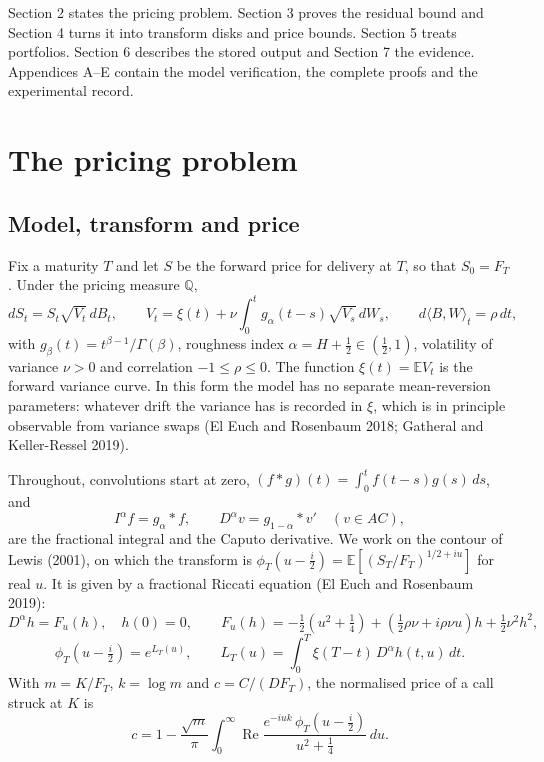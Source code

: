 \documentclass[11pt,a4paper]{article}
\begin{document}
Section 2 states the pricing problem. Section 3 proves the residual bound and Section 4 turns it into transform disks and price bounds. Section 5 treats portfolios. Section 6 describes the stored output and Section 7 the evidence. Appendices A–E contain the model verification, the complete proofs and the experimental record.

\setcounter{section}{1}\section{The pricing problem}

\setcounter{subsection}{0}\subsection{Model, transform and price}

Fix a maturity \(T\) and let \(S\) be the forward price for delivery at \(T\), so that \(S_0=F_T\). Under the pricing measure \(\mathbb Q\),
\begin{equation*}\tag{2.1}
dS_t=S_t\sqrt{V_t}\,dB_t,\qquad
V_t=\xi(t)+\nu\int_0^tg_\alpha(t-s)\sqrt{V_s}\,dW_s,\qquad
d\langle B,W\rangle_t=\rho\,dt,
\end{equation*}
with \(g_\beta(t)=t^{\beta-1}/\Gamma(\beta)\), roughness index \(\alpha=H+\tfrac12\in(\tfrac12,1)\), volatility of variance \(\nu>0\) and correlation \(-1\le\rho\le0\). The function \(\xi(t)=\mathbb E V_t\) is the forward variance curve. In this form the model has no separate mean-reversion parameters: whatever drift the variance has is recorded in \(\xi\), which is in principle observable from variance swaps (El Euch and Rosenbaum 2018; Gatheral and Keller-Ressel 2019).

Throughout, convolutions start at zero, \((f*g)(t)=\int_0^tf(t-s)g(s)\,ds\), and
\begin{equation*}\tag{2.2}
I^\alpha f=g_\alpha*f,\qquad D^\alpha v=g_{1-\alpha}*v'\quad(v\in AC),
\end{equation*}
are the fractional integral and the Caputo derivative. We work on the contour of Lewis (2001), on which the transform is \(\phi_T(u-\tfrac i2)=\mathbb E[(S_T/F_T)^{1/2+iu}]\) for real \(u\). It is given by a fractional Riccati equation (El Euch and Rosenbaum 2019):
\begin{equation*}\tag{2.3}
D^\alpha h=F_u(h),\quad h(0)=0,\qquad
F_u(h)=-\tfrac12\left(u^2+\tfrac14\right)+\left(\tfrac12\rho\nu+i\rho\nu u\right)h+\tfrac12\nu^2h^2,
\end{equation*}
\begin{equation*}\tag{2.4}
\phi_T(u-\tfrac i2)=e^{L_T(u)},\qquad
L_T(u)=\int_0^T\xi(T-t)\,D^\alpha h(t,u)\,dt .
\end{equation*}
With \(m=K/F_T\), \(k=\log m\) and \(c=C/(DF_T)\), the normalised price of a call struck at \(K\) is
\begin{equation*}\tag{2.5}
c=1-\frac{\sqrt m}{\pi}\int_0^\infty\operatorname{Re}\frac{e^{-iuk}\,\phi_T(u-\tfrac i2)}{u^2+\frac14}\,du .
\end{equation*}
\end{document}
